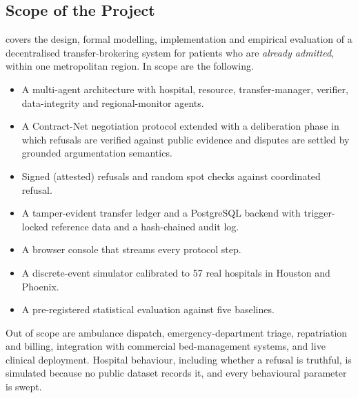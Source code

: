 \subsection{Scope of the Project}
\mahros{} covers the design, formal modelling, implementation and empirical evaluation of a decentralised transfer-brokering system for patients who are \emph{already admitted}, within one metropolitan region. In scope are the following.
\begin{itemize}
\setlength{\itemsep}{1pt}
\item A multi-agent architecture with hospital, resource, transfer-manager, verifier, data-integrity and regional-monitor agents.
\item A Contract-Net negotiation protocol extended with a deliberation phase in which refusals are verified against public evidence and disputes are settled by grounded argumentation semantics.
\item Signed (attested) refusals and random spot checks against coordinated refusal.
\item A tamper-evident transfer ledger and a PostgreSQL backend with trigger-locked reference data and a hash-chained audit log.
\item A browser console that streams every protocol step.
\item A discrete-event simulator calibrated to 57 real hospitals in Houston and Phoenix.
\item A pre-registered statistical evaluation against five baselines.
\end{itemize}
Out of scope are ambulance dispatch, emergency-department triage, repatriation and billing, integration with commercial bed-management systems, and live clinical deployment. Hospital behaviour, including whether a refusal is truthful, is simulated because no public dataset records it, and every behavioural parameter is swept.


